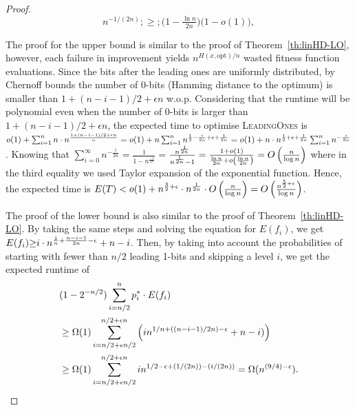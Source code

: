 \documentclass[lettersize,journal]{IEEEtran}
\begin{document}
\begin{proof}
	
	$$ n^{-1/(2n)} ;\ge; \bigl(1-\tfrac{\ln n}{2n}\bigr)\bigl(1-o(1)\bigr), $$ 
	
The proof for the upper bound is similar to the proof of Theorem~\ref{th:linHD-LO}, however, each 
failure in improvement yields $n^{H(x, \text{opt})/n}$ wasted fitness function evaluations. 
Since the bits after the leading ones are uniformly distributed, by Chernoff bounds the number 
of 0-bits (Hamming distance to the optimum) is smaller than  $1+(n-i-1)/2+\epsilon n$ 
w.o.p. {\color{black}Considering that the runtime will be polynomial even when the number of $0$-bits is larger than $1+(n-i-1)/2+\epsilon n$}, the expected time to optimise \textsc{LeadingOnes} is ${\color{black}o(1)}+\sum_{i=1}^{n} n \cdot 
n^{\frac{1+(n-i-1)/2+\epsilon n}{n}}= {\color{black}o(1)}+n \sum_{i=1}^{n} 
n^{\frac{1}{2}-\frac{i}{2n}+\epsilon+\frac{1}{2n}}={\color{black}o(1)}+n \cdot n^{\frac{1}{2}+\epsilon+\frac{1}{2n}} \sum_{i=1}^{n} 
n^{-\frac{i}{2n}}$. Knowing that 
$\sum_{i=0}^{\infty}n^{-\frac{i}{2n}}=\frac{1}{1-n^{\frac{-1}{2n}}}=${$\color{black} \frac{n^{\frac{1}{2n}}}{n^{\frac{1}{2n}} - 1} = \frac{1 + o(1)}{\frac{\ln{n}}{2n} + o\left(\frac{\ln{n}}{2n}\right)} = O\left(\frac{n}{\log{n}}\right)$ where in the third equality we used Taylor expansion of the exponential function.}  Hence, the expected time is $E(T) 
< {\color{black}o(1)}+n^{\frac{3}{2}+\epsilon} \cdot n^{\frac{1}{2n}} \cdot O\left(\frac{n}{\log n}\right)=O\left(\frac{n^{\frac{5}{2}+\epsilon}}{\log n}\right)$.



The proof of the lower bound is also similar to the proof of Theorem~\ref{th:linHD-LO}. 
By taking the same steps and solving the equation for $E(f_i)$, we get
$E(f_i){\color{black}\ge} i \cdot n^{\frac{1}{n}+\frac{n-i-1}{2n}-\epsilon}+n-i$. Then, by taking into account the probabilities of starting with fewer than $n/2$ leading 1-bits and skipping a level $i$, we get the expected runtime of 
\begin{align*}
&(1-2^{-n/2})\sum_{i=n/2}^{n} {\color{black}p_{i}^{*}} \cdot E(f_i)\\
&\geq \Omega(1) \sum_{i=n/2+\epsilon 
	n/2}^{n/2+\epsilon n} 
\left( i n^{1/n+((n-i-1)/2n)-\epsilon}+n-i )\right)\\
&\geq \Omega(1) \sum_{i=n/2+\epsilon 
	n/2}^{n/2+\epsilon n}  in^{1/2-\epsilon+(1/(2n))-(i/(2n))}= \Omega(n^{(9/4)-\epsilon}).
	\end{align*} 
\end{proof}
\end{document}
